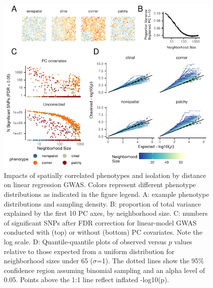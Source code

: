 \documentclass[9pt,twocolumn,twoside,lineno]{gsajnl}
\begin{document}
\afterpage{\clearpage}
\begin{figure}[p]
\centering
\includegraphics[width=\textwidth]{gwas_summary_nsig_qqplots.pdf}
\caption{Impacts of spatially correlated phenotypes and isolation by distance on linear regression GWAS. Colors represent different phenotype distributions as indicated in the figure legend. A: example phenotype distributions and sampling density. B: proportion of total variance explained by the first 10 PC axes, by neighborhood size. C: numbers of significant SNPs after FDR correction for linear-model GWAS conducted with (top) or without (bottom) PC covariates. Note the log scale. D: Quantile-quantile plots of observed versus $p$ values relative to those expected from a uniform distribution for neighborhood sizes under 65 ($\sigma$=1). The dotted lines show the 95\% confidence region assuming binomial sampling and an alpha level of 0.05. Points above the 1:1 line reflect inflated -log10(p).}
\label{fig:spectrum}
\end{figure}

\afterpage{\clearpage}


\end{document}

